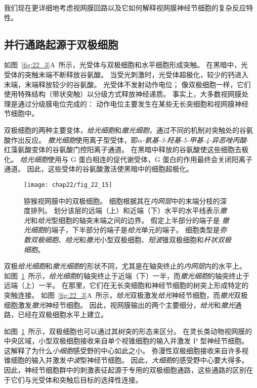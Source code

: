 我们现在更详细地考虑视网膜回路以及它如何解释视网膜神经节细胞的复杂反应特性。


\subsection{并行通路起源于双极细胞}

如图~\ref{fig:22_3}A~所示，光受体与双极细胞和水平细胞形成突触。
在黑暗中，光受体的突触末端不断释放谷氨酸。
当受光刺激时，光受体超极化，较少的钙进入末端，末端释放较少的谷氨酸。
光受体不发射动作电位；
像双极细胞一样，它们使用特殊结构（带状突触）以分级方式释放神经递质。
事实上，大多数视网膜处理是通过分级膜电位完成的：
动作电位主要发生在某些无长突细胞和视网膜神经节细胞中。


双极细胞的两种主要变体，\textit{给光细胞}和\textit{撤光细胞}，通过不同的机制对突触处的谷氨酸作出反应。
\textit{撤光细胞}使用离子型受体，即\textit{$\alpha$-氨基-3-羟基-5-甲基-4-异恶唑丙酸}-红藻氨酸变体的谷氨酸门控阳离子通道。
在黑暗中释放的谷氨酸使这些细胞去极化。
\textit{给光细胞}使用与 G 蛋白相连的促代谢受体，G 蛋白的作用最终会关闭阳离子通道。
因此，这些受体的谷氨酸激活使黑暗中的细胞超极化。


\begin{figure}[htbp]
	\centering
	\texttt{[image: chap22/fig\_22\_15]}
	\caption{猕猴视网膜中的双极细胞。
		细胞根据其在\textit{内网层}中的末端分枝的深度排列。
		划分该层的远端（上）和近端（下）水平的水平线表示\textit{撤光}和\textit{给光}型细胞的轴突末端之间的边界。
		假定上半部分的端子是 \textit{撤光细胞}的端子，下半部分的端子是\textit{给光}单元的端子。
		细胞类型是\textit{弥散双极细胞}、\textit{给光}和\textit{撤光}小型双极细胞、\textit{短波}锥双极细胞和\textit{杆状双极细胞}。}
	\label{fig:22_15}
\end{figure}


双极\textit{给光细胞}和\textit{撤光细胞}的形状不同，尤其是在轴突终止的\textit{内网层}内的水平上。
如图~\ref{fig:22_15}~所示，\textit{给光细胞}的轴突终止于近端（下）一半，而\textit{撤光细胞}的轴突终止于远端（上）一半。
在那里，它们在无长突细胞和神经节细胞的树突上形成特定的突触连接。
如图~\ref{fig:22_3}A~所示，\textit{给光}双极激发\textit{给光}神经节细胞，而\textit{撤光}双极细胞激发\textit{撤光}神经节细胞。
因此，视网膜输出的两个主要细分，\textit{给光}和\textit{撤光}通路，已经在双极细胞水平上建立。


如图~\ref{fig:22_15}~所示，双极细胞也可以通过其树突的形态来区分。
在灵长类动物视网膜的中央区域，小型双极细胞接收来自单个视锥细胞的输入并激发 P 型神经节细胞。
这解释了为什么\textit{小细胞}感受野的中心如此之小。
弥漫性双极细胞接收来自许多视锥细胞的输入并激发\textit{中波}型神经节细胞。
因此，\textit{大细胞}的感受野中心要大得多。
因此，神经节细胞群中的刺激表征起源于专用的双极细胞通路，这些通路的区别在于它们与光受体和突触后目标的选择性连接。



